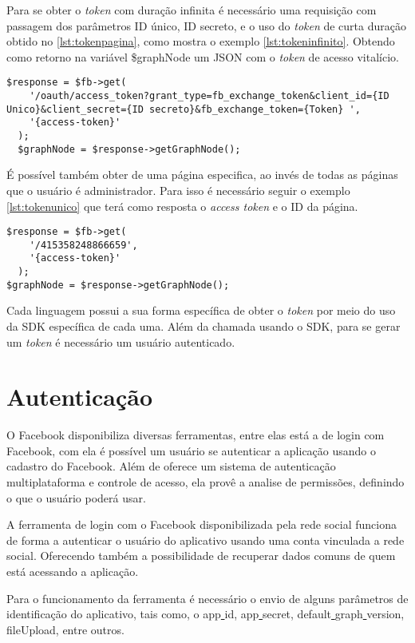 Para se obter o \textit{token} com duração infinita é necessário uma requisição com passagem dos parâmetros ID único, ID secreto, e o uso do \textit{token} de curta duração obtido no \ref{lst:tokenpagina}, como mostra o exemplo \ref{lst:tokeninfinito}. Obtendo como retorno na variável \$graphNode um JSON com o \textit{token} de acesso vitalício.

\begin{lstlisting}[caption={Obtendo Token Infinito},label={lst:tokeninfinito}]
  $response = $fb->get(
    '/oauth/access_token?grant_type=fb_exchange_token&client_id={ID Unico}&client_secret={ID secreto}&fb_exchange_token={Token} ',
    '{access-token}'
  );
  $graphNode = $response->getGraphNode();
\end{lstlisting}

É possível também obter de uma página especifica, ao invés de todas as páginas que o usuário é administrador. Para isso é necessário seguir o exemplo \ref{lst:tokenunico} que terá como resposta o \textit{access token} e o ID da página.

\begin{lstlisting}[caption={Obtendo Token de uma única página},label={lst:tokenunico}]
  $response = $fb->get(
    '/415358248866659',
    '{access-token}'
  );
$graphNode = $response->getGraphNode();
\end{lstlisting}

Cada linguagem possui a sua forma específica de obter o \textit{token} por meio do uso da SDK específica de cada uma. Além da chamada usando o SDK, para se gerar um \textit{token} é necessário um usuário autenticado.

\section{Autenticação}
O Facebook disponibiliza diversas ferramentas, entre elas está a de login com Facebook, com ela é possível um usuário se autenticar a aplicação usando o cadastro do Facebook. Além de oferece um sistema de autenticação multiplataforma e controle de acesso, ela provê a analise de permissões, definindo o que o usuário poderá usar. \cite{facebook2018c}

A ferramenta de login com o Facebook disponibilizada pela rede social funciona de forma a autenticar o usuário do aplicativo usando uma conta vinculada a rede social. Oferecendo também a possibilidade de recuperar dados comuns de quem está acessando a aplicação.

Para o funcionamento da ferramenta é necessário o envio de alguns parâmetros de identificação do aplicativo, tais como, o app\underline{{ }}id, app\underline{{ }}secret, default\underline{{ }}graph\underline{{ }}version, fileUpload, entre outros.

